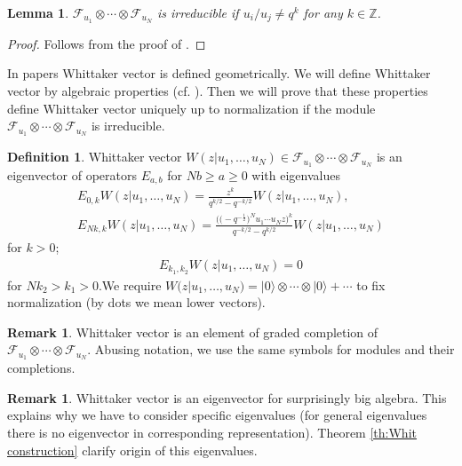 \documentclass[pdftex]{sigma}
\numberwithin{equation}{section}
\newtheorem{Lemma}[Theorem]{Lemma}
\theoremstyle{definition}
\newtheorem{Remark}[Theorem]{Remark}
\newtheorem{Definition}[Theorem]{Definition}
\newcommand{\half}{\frac{1}{2}}
\newcommand{\vac}{|0 \rangle}
\begin{document}
\begin{Lemma} \label{lemma 3.1 FJMM}
$\mathcal{F}_{u_1} \otimes \cdots \otimes \mathcal{F}_{u_N}$ is irreducible if $u_i/u_j \neq q^{k}$ for any $k \in \mathbb{Z}$.
\end{Lemma}
\begin{proof}
Follows from the proof of \cite[Lemma 3.1]{FFJMM}.
\end{proof}
In papers \cite{N12,Ts} Whittaker vector is defined geometrically. We will define Whittaker vector by algebraic properties (cf. \cite[Proposition~4.15]{N12}). Then we will prove that these properties define Whittaker vector uniquely up to normalization if the module $\mathcal{F}_{u_1} \otimes \cdots \otimes \mathcal{F}_{u_N}$ is irreducible.



\begin{Definition} \label{def: Whit eigen}
Whittaker vector $W(z|u_1, \dots, u_N) \in \mathcal{F}_{u_1} \otimes \cdots \otimes \mathcal{F}_{u_N}$ is an eigenvector of operators $E_{a,b}$ for $Nb \geqslant a \geqslant 0$ with eigenvalues
\begin{gather}
E_{0,k} W(z|u_1, \dots, u_N) = \frac{z^k}{q^{k/2}-q^{-k/2}} W(z|u_1, \dots, u_N), \label{eq: Whit eigen1} \\
E_{Nk,k} W(z|u_1, \dots, u_N) = \frac{\big(\big({-}q^{-\half}
\big)^Nu_1 \cdots u_N z\big)^{k}}{q^{-k/2}-q^{k/2}} W(z|u_1, \dots, u_N) \label{eq: Whit eigen2}
\end{gather}
for $k>0$;
\begin{gather}
E_{k_1, k_2} W(z|u_1, \dots, u_N) =0 \label{eq: Whit eigen3}
\end{gather}
for $N k_2 > k_1 > 0$.We require $W(z|u_1, \dots, u_N) = \vac \otimes \cdots \otimes \vac + \cdots$ to fix normalization (by dots we mean lower vectors).
\end{Definition}

\begin{Remark}
Whittaker vector is an element of graded completion of $\mathcal{F}_{u_1} \otimes \cdots \otimes \mathcal{F}_{u_N}$. Abusing notation, we use the same symbols for modules and their completions.
\end{Remark}

\begin{Remark}
Whittaker vector is an eigenvector for surprisingly big algebra. This explains why we have to consider specific eigenvalues (for general eigenvalues there is no eigenvector in corresponding representation). Theorem \ref{th:Whit construction} clarify origin of this eigenvalues.
\end{Remark}
\end{document}
